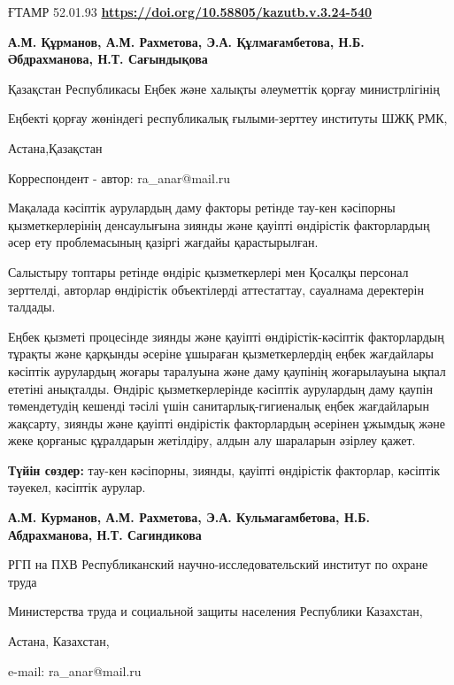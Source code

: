 \newpage
ҒТАМР 52.01.93
\hfill {\bfseries \href{https://doi.org/10.58805/kazutb.v.3.24-540}{https://doi.org/10.58805/kazutb.v.3.24-540}}


\begin{center}
{\bfseries А.М. Құрманов, А.М. Рахметова\envelope, Э.А. Құлмағамбетова, Н.Б. Әбдрахманова, Н.Т. Сағындықова}

Қазақстан Республикасы Еңбек және халықты әлеуметтік қорғау
министрлігінің

Еңбекті қорғау жөніндегі республикалық ғылыми-зерттеу институты ШЖҚ РМК,

Астана,Қазақстан

\envelope Корреспондент - автор: ra\_anar@mail.ru
\end{center}

Мақалада кәсіптік аурулардың даму факторы ретінде тау-кен кәсіпорны
қызметкерлерінің денсаулығына зиянды және қауіпті өндірістік
факторлардың әсер ету проблемасының қазіргі жағдайы қарастырылған.

Салыстыру топтары ретінде өндіріс қызметкерлері мен Қосалқы персонал
зерттелді, авторлар өндірістік объектілерді аттестаттау, сауалнама
деректерін талдады.

Еңбек қызметі процесінде зиянды және қауіпті өндірістік-кәсіптік
факторлардың тұрақты және қарқынды әсеріне ұшыраған қызметкерлердің
еңбек жағдайлары кәсіптік аурулардың жоғары таралуына және даму қаупінің
жоғарылауына ықпал ететіні анықталды. Өндіріс қызметкерлерінде кәсіптік
аурулардың даму қаупін төмендетудің кешенді тәсілі үшін
санитарлық-гигиеналық еңбек жағдайларын жақсарту, зиянды және қауіпті
өндірістік факторлардың әсерінен ұжымдық және жеке қорғаныс құралдарын
жетілдіру, алдын алу шараларын әзірлеу қажет.

{\bfseries Түйін сөздер:} тау-кен кәсіпорны, зиянды, қауіпті өндірістік
факторлар, кәсіптік тәуекел, кәсіптік аурулар.


\begin{center}
{\bfseries А.М. Курманов, А.М. Рахметова\envelope, Э.А. Кульмагамбетова, Н.Б. Абдрахманова, Н.Т. Сагиндикова}

РГП на ПХВ Республиканский научно-исследовательский институт по охране
труда

Министерства труда и социальной защиты населения Республики Казахстан,

Астана, Казахстан,

e-mail: ra\_anar@mail.ru
\end{center}

